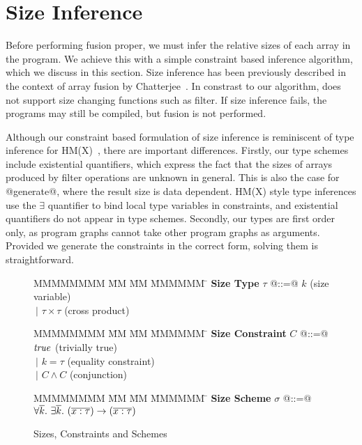 \section{Size Inference}
Before performing fusion proper, we must infer the relative sizes of each array in the program. We achieve this with a simple constraint based inference algorithm, which we discuss in this section. Size inference has been previously described in the context of array fusion by Chatterjee~\cite{chatterjee1991size}. In constrast to our algorithm, \cite{chatterjee1991size} does not support size changing functions such as filter.
If size inference fails, the programs may still be compiled, but fusion is not performed.

Although our constraint based formulation of size inference is reminiscent of type inference for HM(X)~\cite{odersky1999type}, there are important differences. Firstly, our type schemes include existential quantifiers, which express the fact that the sizes of arrays produced by filter operations are unknown in general. This is also the case for @generate@, where the result size is data dependent. HM(X) style type inferences use the $\exists$ quantifier to bind local type variables in constraints, and existential quantifiers do not appear in type schemes. Secondly, our types are first order only, as program graphs cannot take other program graphs as arguments. Provided we generate the constraints in the correct form, solving them is straightforward.


\begin{figure}
\begin{tabbing}
MMMMMMMM \= MM  \= MM \= MMMMMM \= \kill
\textbf{Size Type}
\> $\tau$   \> @::=@  \> $k$                  \> (size variable)       \\
\>          \> $~|$   \> $\tau \times \tau$   \> (cross product)
\end{tabbing}

\begin{tabbing}
MMMMMMMM \= MM  \= MM \= MMMMMM \= \kill
\textbf{Size Constraint}
\> $C$      \> @::=@  \> $\mathit{true}$               \> (trivially true)      \\
\>          \> $~|$   \> $k = \tau$           \> (equality constraint) \\
\>          \> $~|$   \> $C \wedge C$         \> (conjunction)
\end{tabbing}

\begin{tabbing}
MMMMMMMM \= MM  \= MM \= MMMMMM \= \kill
\textbf{Size Scheme}
\> $\sigma$ \> @::=@  
        \> $\forall \overline{k}.~ \exists \overline{k}.~ (\overline{ x : \tau }) \to (\overline{x : \tau})$
\end{tabbing}

\caption{Sizes, Constraints and Schemes}
\label{clustering:f:constraints}
\end{figure}


